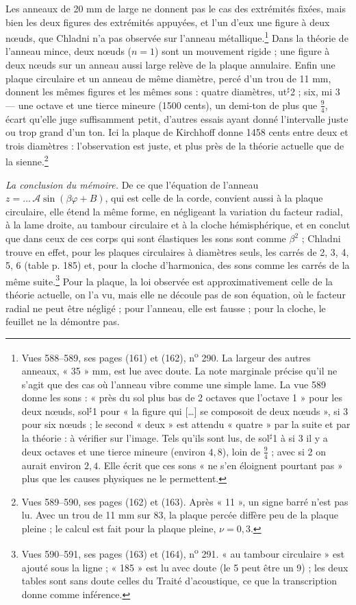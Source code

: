 \documentclass[11pt,a4paper]{article}
\begin{document}
Les anneaux de 20 mm de large ne donnent pas le cas des extrémités fixées, mais
bien les deux figures des extrémités appuyées, et l'un d'eux une figure à deux
nœuds, que Chladni n'a pas observée sur l'anneau métallique.\footnote{Vues
588--589, ses pages (161) et (162), n\textsuperscript{o} 290. La largeur des
autres anneaux, « 35 » mm, est lue avec doute. La note marginale précise qu'il
ne s'agit que des cas où l'anneau vibre comme une simple lame. La vue 589 donne
les sons : « près du sol plus bas de 2 octaves que l'octave 1 » pour les deux
nœuds, sol$^{\sharp}$1 pour « la figure qui […] se composoit de deux nœuds »,
si 3 pour six nœuds ; le second « deux » est attendu « quatre » par la suite et
par la théorie : à vérifier sur l'image. Tels qu'ils sont lus, de
sol$^{\sharp}$1 à si 3 il y a deux octaves et une tierce mineure (environ
$4{,}8$), loin de $\frac94$ ; avec si 2 on aurait environ $2{,}4$. Elle écrit
que ces sons « ne s'en éloignent pourtant pas » plus que les causes physiques ne
le permettent.} Dans la théorie de l'anneau mince, deux nœuds ($n = 1$) sont un
mouvement rigide ; une figure à deux nœuds sur un anneau aussi large relève de la
plaque annulaire. Enfin une plaque circulaire et un anneau de même diamètre,
percé d'un trou de 11 mm, donnent les mêmes figures et les mêmes sons : quatre
diamètres, ut$^{\sharp}$2 ; six, mi 3 — une octave et une tierce mineure
(1500 cents), un demi-ton de plus que $\frac94$, écart qu'elle juge suffisamment
petit, d'autres essais ayant donné l'intervalle juste ou trop grand d'un ton.
Ici la plaque de Kirchhoff donne 1458 cents entre deux et trois diamètres :
l'observation est juste, et plus près de la théorie actuelle que de la
sienne.\footnote{Vues 589--590, ses pages (162) et (163). Après « 11 », un signe
barré n'est pas lu. Avec un trou de 11 mm sur 83, la plaque percée diffère peu de
la plaque pleine ; le calcul est fait pour la plaque pleine, $\nu = 0{,}3$.}

\emph{La conclusion du mémoire.} De ce que l'équation de l'anneau
$z = \dots\,\mathcal{A}\sin(\beta\varphi+B)$, qui est celle de la corde, convient
aussi à la plaque circulaire, elle étend la même forme, en négligeant la
variation du facteur radial, à la lame droite, au tambour circulaire et à la
cloche hémisphérique, et en conclut que dans ceux de ces corps qui sont
élastiques les sons sont comme $\beta^2$ ; Chladni trouve en effet, pour les
plaques circulaires à diamètres seuls, les carrés de 2, 3, 4, 5, 6 (table p. 185)
et, pour la cloche d'harmonica, des sons comme les carrés de la même
suite.\footnote{Vues 590--591, ses pages (163) et (164), n\textsuperscript{o}
291. « au tambour circulaire » est ajouté sous la ligne ; « 185 » est lu avec
doute (le 5 peut être un 9) ; les deux tables sont sans doute celles du Traité
d'acoustique, ce que la transcription donne comme inférence.} Pour la plaque, la
loi observée est approximativement celle de la théorie actuelle, on l'a vu, mais
elle ne découle pas de son équation, où le facteur radial ne peut être négligé ;
pour l'anneau, elle est fausse ; pour la cloche, le feuillet ne la démontre
pas.
\end{document}
